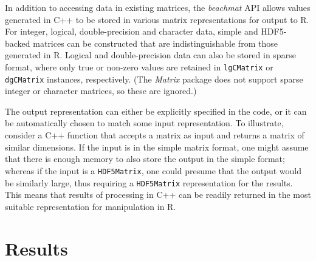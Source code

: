 \documentclass[10pt,letterpaper]{article}
\newcommand{\suppseclayoutoptim}{2}
\newcommand{\beachmat}{\textit{beachmat}}
\newcommand{\code}[1]{\texttt{#1}}
\begin{document}
In addition to accessing data in existing matrices, the \beachmat{} API allows values generated in C++ to be stored in various matrix representations for output to R.
For integer, logical, double-precision and character data, simple and HDF5-backed matrices can be constructed that are indistinguishable from those generated in R.
Logical and double-precision data can also be stored in sparse format, where only true or non-zero values are retained in \code{lgCMatrix} or \code{dgCMatrix} instances, respectively.
(The \textit{Matrix} package does not support sparse integer or character matrices, so these are ignored.)

The output representation can either be explicitly specified in the code, or it can be automatically chosen to match some input representation.
To illustrate, consider a C++ function that accepts a matrix as input and returns a matrix of similar dimensions.
If the input is in the simple matrix format, one might assume that there is enough memory to also store the output in the simple format;
whereas if the input is a \code{HDF5Matrix}, one could presume that the output would be similarly large, thus requiring a \code{HDF5Matrix} representation for the results.
This means that results of processing in C++ can be readily returned in the most suitable representation for manipulation in R.
 
%

\section*{Results}
\end{document}
